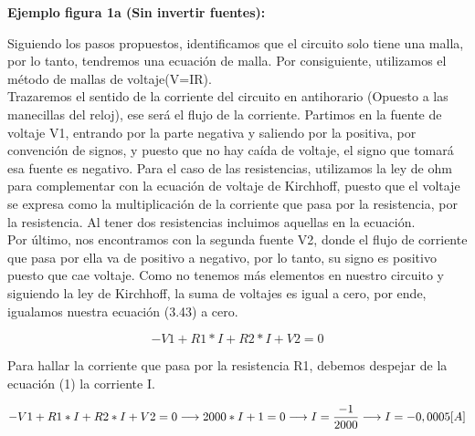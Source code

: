 \begin{example}
\begin{enumerate}
        \end{enumerate}

        \newpage
        \textbf{Ejemplo figura 1a (Sin invertir fuentes):}

        \iffalse
            \begin{figure}[H]
                \centering
                \texttt{[image: image/SinFuenteinvertida1.png]}
                \caption{Circuito sin invertir fuentes y con sentido de corriente antihorario}
                \label{fig:1011101011}
            \end{figure}
        \fi
        Siguiendo los pasos propuestos, identificamos que el circuito solo tiene una malla, por lo tanto, tendremos una ecuación de malla. Por consiguiente, utilizamos el método de mallas de voltaje(V=IR).
        \\
        Trazaremos el sentido de la corriente del circuito en antihorario (Opuesto a las manecillas del reloj), ese será el flujo de la corriente. Partimos en la fuente de voltaje V1, entrando por la parte negativa y saliendo por la positiva, por convención de signos, y puesto que no hay caída de voltaje, el signo que tomará esa fuente es negativo. Para el caso de las resistencias, utilizamos la ley de ohm para complementar con la ecuación de voltaje de Kirchhoff, puesto que el voltaje se expresa como la multiplicación de la corriente que pasa por la resistencia, por la resistencia. Al tener dos resistencias incluimos aquellas en la ecuación.
        \\
        Por último, nos encontramos con la segunda fuente V2, donde el flujo de corriente que pasa por ella va de positivo a negativo, por lo tanto, su signo es positivo puesto que cae voltaje. Como no tenemos más elementos en nuestro circuito y siguiendo la ley de Kirchhoff, la suma de voltajes es igual a cero, por ende, igualamos nuestra ecuación (3.43) a cero.
        \begin{center}
            \begin{equation*}
            -V1+R1*I+R2*I+V2=0
            \end{equation*}
        \end{center}

        Para hallar la corriente que pasa por la resistencia R1, debemos despejar de la ecuación (1) la corriente I.


        \begin{equation*}
        \notag
        -V1+R1*I+R2*I+V2=0
        \longrightarrow
        2000*I+1=0
        \longrightarrow
        I= \frac{-1}{2000}
        \longrightarrow
        I=-0,0005[A]
        \end{equation*}


\end{example}
